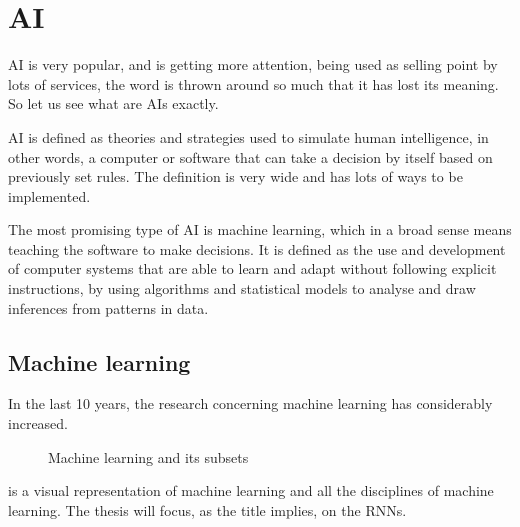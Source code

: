 \section{\acl{AI}}\label{sec:ai}

\acf{AI} is very popular, and is getting more attention, being used as selling point by lots of services, the word is thrown around so much that it has lost its meaning. So let us see what are \acp{AI} exactly.

\ac{AI} is defined as theories and strategies used to simulate human intelligence, in other words, a computer or software that can take a decision by itself based on previously set rules. The definition is very wide and has lots of ways to be implemented.

The most promising type of \ac{AI} is machine learning, which in a broad sense means teaching the software to make decisions. It is defined as the use and development of computer systems that are able to learn and adapt without following explicit instructions, by using algorithms and statistical models to analyse and draw inferences from patterns in data.

\subsection{Machine learning}

In the last 10 years, the research concerning machine learning has considerably increased.

\begin{figure}[H]
  \centering
  
  \caption{Machine learning and its subsets}
  \label{fig:ml}
\end{figure}

 is a visual representation of machine learning and all the disciplines of machine learning. The thesis will focus, as the title implies, on the \aclp{RNN}.
